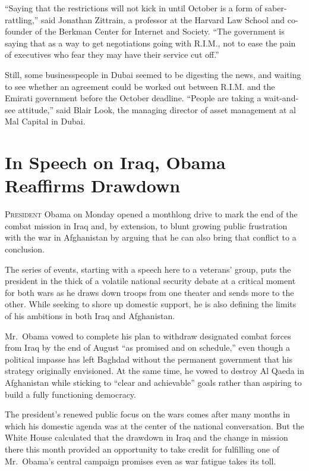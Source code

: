 ﻿\documentclass[12pt]{article}
\begin{document}
``Saying that the restrictions will not kick in until October is a form of saber-rattling,'' said
Jonathan Zittrain, a professor at the Harvard Law School and co-founder of the Berkman Center for
Internet and Society. ``The government is saying that as a way to get negotiations going with
R.I.M., not to ease the pain of executives who fear they may have their service cut off.''

Still, some businesspeople in Dubai seemed to be digesting the news, and waiting to see whether an
agreement could be worked out between R.I.M. and the Emirati government before the October deadline.
``People are taking a wait-and-see attitude,'' said Blair Look, the managing director of asset
management at al Mal Capital in Dubai.

\section{In Speech on Iraq, Obama Reaffirms Drawdown}

\lettrine{P}{resident} Obama on Monday opened a monthlong drive to mark the
end of the combat mission in Iraq and, by extension, to blunt growing public frustration with the
war in Afghanistan by arguing that he can also bring that conflict to a conclusion.

The series of events, starting with a speech here to a veterans' group, puts the president in the
thick of a volatile national security debate at a critical moment for both wars as he draws down
troops from one theater and sends more to the other. While seeking to shore up domestic support, he
is also defining the limits of his ambitions in both Iraq and Afghanistan.

Mr.~Obama vowed to complete his plan to withdraw designated combat forces from Iraq by the end of
August ``as promised and on schedule,'' even though a political impasse has left Baghdad without the
permanent government that his strategy originally envisioned. At the same time, he vowed to destroy
Al Qaeda in Afghanistan while sticking to ``clear and achievable'' goals rather than aspiring to
build a fully functioning democracy.

The president's renewed public focus on the wars comes after many months in which his domestic
agenda was at the center of the national conversation. But the White House calculated that the
drawdown in Iraq and the change in mission there this month provided an opportunity to take credit
for fulfilling one of Mr.~Obama's central campaign promises even as war fatigue takes its toll.
\end{document}
